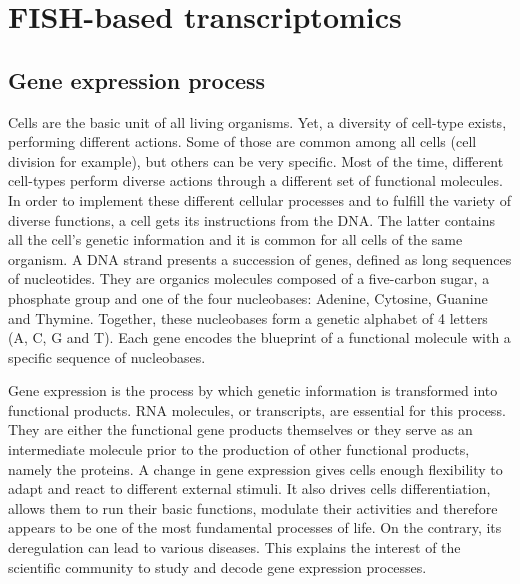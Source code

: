 
\graphicspath{{./figures/introduction/}}

\chapter{FISH-based transcriptomics}
\label{ch:introduction}

\minitoc
\newpage


\section{Gene expression process}
\label{sec:gene_expression}

Cells are the basic unit of all living organisms.
Yet, a diversity of cell-type exists, performing different actions.
Some of those are common among all cells (cell division for example), but others can be very specific.
Most of the time, different cell-types perform diverse actions through a different set of functional molecules.
In order to implement these different cellular processes and to fulfill the variety of diverse functions, a cell gets its instructions from the \ac{DNA}.
The latter contains all the cell's genetic information and it is common for all cells of the same organism.
A \ac{DNA} strand presents a succession of genes, defined as long sequences of nucleotides.
They are organics molecules composed of a five-carbon sugar, a phosphate group and one of the four nucleobases: Adenine, Cytosine, Guanine and Thymine.
Together, these nucleobases form a genetic alphabet of 4 letters (A, C, G and  T).
Each gene encodes the blueprint of a functional molecule with a specific sequence of nucleobases.

Gene expression is the process by which genetic information is transformed into functional products.
\ac{RNA} molecules, or transcripts, are essential for this process.
They are either the functional gene products themselves or they serve as an intermediate molecule prior to the production of other functional products, namely the proteins.
A change in gene expression gives cells enough flexibility to adapt and react to different external stimuli.
It also drives cells differentiation, allows them to run their basic functions, modulate their activities and therefore appears to be one of the most fundamental processes of life.
On the contrary, its deregulation can lead to various diseases.
This explains the interest of the scientific community to study and decode gene expression processes.

